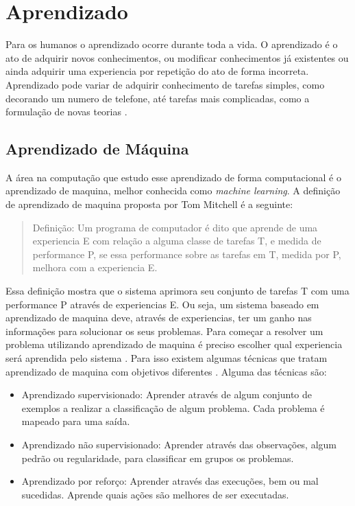 \section{Aprendizado} 
Para os humanos o aprendizado ocorre durante toda a vida. 
O aprendizado é o ato de adquirir novos conhecimentos, ou modificar conhecimentos já existentes ou ainda adquirir uma experiencia por repetição do ato de forma incorreta. 
Aprendizado pode variar de adquirir conhecimento de tarefas simples, como decorando um numero de telefone, até tarefas mais complicadas, como a formulação de novas teorias \cite{intelligence2003modern}. 

\subsection{Aprendizado de Máquina} 

A área na computação que estudo esse aprendizado de forma computacional é o aprendizado de maquina, melhor conhecida como \textit{machine learning}. A definição de aprendizado de maquina proposta por Tom Mitchell \cite{Mitchell1997ML} é a seguinte:

 \begin{quote}
 	Definição: Um programa de computador é dito que aprende de uma experiencia E com relação a alguma classe de tarefas T, e medida de performance P, se essa performance sobre as tarefas em T, medida por P, melhora com a experiencia E.
 \end{quote}

Essa definição mostra que o sistema aprimora seu conjunto de tarefas T com uma performance P através de experiencias E. Ou seja, um sistema baseado em aprendizado de maquina deve, através de experiencias, ter um ganho nas informações para solucionar os seus problemas. Para começar a resolver um problema utilizando aprendizado de maquina é preciso escolher qual experiencia será aprendida pelo sistema \cite{Mitchell1997ML}. Para isso existem algumas técnicas que tratam aprendizado de maquina com objetivos diferentes \cite{intelligence2003modern}. Alguma das técnicas são: %

\begin{itemize}
	\item Aprendizado supervisionado: Aprender através de algum conjunto de exemplos a realizar a classificação de algum problema. Cada problema é mapeado para uma saída. 
	\item Aprendizado não supervisionado: Aprender através das observações, algum pedrão ou regularidade, para classificar em grupos os problemas.
	\item Aprendizado por reforço: Aprender através das execuções, bem ou mal sucedidas. Aprende quais ações são melhores de ser executadas.
\end{itemize}


